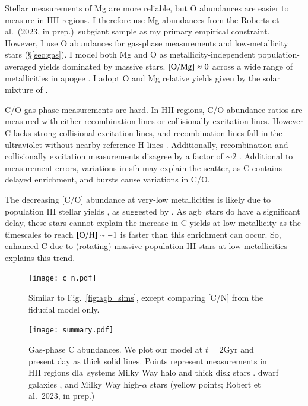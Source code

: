 \documentclass[12pt,oneside,letterpaper]{report}
\newcommand{\agb}{\gls{agb}}
\newcommand{\sfh}{\gls{sfh}}
\newcommand{\dla}{\gls{dla}}
\newcommand{\apogee}{\gls{apogee}}
\newcommand{\citetjack}{Roberts et al.~(2023, in prep.)}
\newcommand{\citealtjack}{Robert et al.~2023, in prep.}
\newcommand{\about}[1]{${\sim} #1$}
\begin{document}
Stellar measurements of Mg are more reliable, but O abundances are easier to measure in HII regions.  I therefore use Mg abundances from the \citetjack~subgiant sample as my primary empirical constraint. However, I use O abundances for gas-phase measurements and low-metallicity stars (\S \ref{sec:gas}). I model both Mg and O as metallicity-independent population-averaged yields dominated by massive stars. ${\rm [O/Mg]}\approx 0$ across a wide range of metallicities in \apogee{} \citep{weinberg+19, weinberg+22}. 
I adopt O and Mg relative yields given by the solar mixture of \cite{asplund+09}.

C/O gas-phase measurements are hard. In HII-regions, C/O abundance ratios are measured with either recombination lines or collisionally excitation lines. However C lacks strong collisional excitation lines, and recombination lines fall in the ultraviolet without nearby reference H lines \citep{skillman+20}. Additionally, recombination and collisionally excitation measurements disagree by a factor of \about{2} \cite{GR07}.
Additional to measurement errors, variations in \sfh{} may explain the scatter, as C contains delayed enrichment, and bursts cause variations in C/O. 

The decreasing [C/O] abundance at very-low metallicities is likely due to population III stellar yields \citep[e.g.][]{hirschi07}, as suggested by \citep{cooke+17, FN15}.
As \agb\ stars do have a significant delay, these stars cannot explain the increase in C yields at low metallicity as the timescales to reach $\rm [O/H]\sim -1$ is faster than this enrichment can occur. So, enhanced C due to (rotating) massive population III stars at low metallicities explains this trend.

\begin{figure}
    \texttt{[image: c\_n.pdf]}
    \caption[C/N abundance agreement]{Similar to Fig.~\ref{fig:agb_sims}, except comparing [C/N] from the fiducial model only.
    }
\end{figure}

\begin{figure}
\centering
\texttt{[image: summary.pdf]}
\caption[Gas phase abundances]{Gas-phase C abundances. We plot our model at $t=2$Gyr and present day as thick solid lines. Points represent measurements in 
    HII regions    \citep[pink circles;][]{skillman+20, esteban+02, esteban+09, esteban+14, esteban+19}
    \dla\ systems \citep[blue triangles;][]{cooke+17} 
    Milky Way halo and thick disk stars \citep[green stars;][]{nissen+14, fabbian+09}. 
    dwarf galaxies \citep[red diamonds;]{berg+19},
    and Milky Way high-$\alpha$ stars (yellow points; \citealtjack)
}
\label{fig:gas_phase}
\end{figure}
\end{document}
